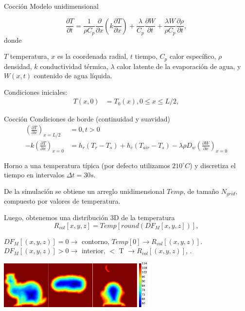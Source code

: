 \documentclass[spanish]{beamer}
\begin{document}
\begin{frame}{Cocción}
Modelo unidimensional

\begin{equation}
\label{Eq:heat}
\frac{\partial T}{\partial t} = \frac{1}{\rho C_{p}} \frac{\partial}{\partial x} \left ( k \frac{\partial T}{\partial x} \right ) + \frac{\lambda}{C_{p}} \frac{\partial W}{\partial t}+\frac{\lambda W}{ \rho C_{p} }\frac{\partial \rho}{\partial t},
\end{equation}
%
\noindent donde

$T$ temperatura, $x$ es la coordenada radial, $t$ tiempo, $C_{p}$ calor específico, $\rho$ densidad, $k$ conductividad térmica, $\lambda$ calor latente de la evaporación de agua, y $W(x,t)$ contenido de agua líquida.

Condiciones iniciales:
\begin{align*}
T(x,0) &= T_{0}(x), 0\le x \le L/2,
\end{align*}

\end{frame}

\begin{frame}{Cocción}
Condiciones de borde (continuidad y suavidad)
\begin{align*}
\left ( \frac{\partial T}{\partial x} \right )_{x=L/2} &= 0 , t > 0 \\
-k \left ( \frac{\partial T}{\partial x} \right )_{x=0} &= h_{r}(T_{r}-T_{s}) + h_{c}(T_{air}-T_{s}) - \lambda \rho D_{w} \left (\frac{\partial W}{\partial x} \right )_{x=0}
\end{align*}
%

\end{frame}

\begin{frame}
Horno a una temperatura típica (por defecto utilizamos $210^{\circ}C$) y discretiza el tiempo en intervalos $\Delta t = 30s$.


De la simulación se obtiene un arreglo unidimensional $Temp$, de tamaño $N_{grid}$, compuesto por valores de temperatura.

Luego, obtenemos una distribución 3D de la temperatura
\begin{equation*}
\displaystyle R_{vol}[x,y,z] = Temp[ round( DF_{M}[x,y,z] ) ], 
\end{equation*}

$DF_{M}[(x,y,z)] = 0 \rightarrow$ contorno, $Temp[0] \rightarrow R_{vol}[(x,y,z)]$.
$DF_{M}[(x,y,z)] > 0 \rightarrow$ interior, $<$ T  $\rightarrow R_{vol}[(x,y,z)]$, .

\centerline{\includegraphics[width=8cm]{../figures/tempsbunny}}
\end{frame}
\end{document}
